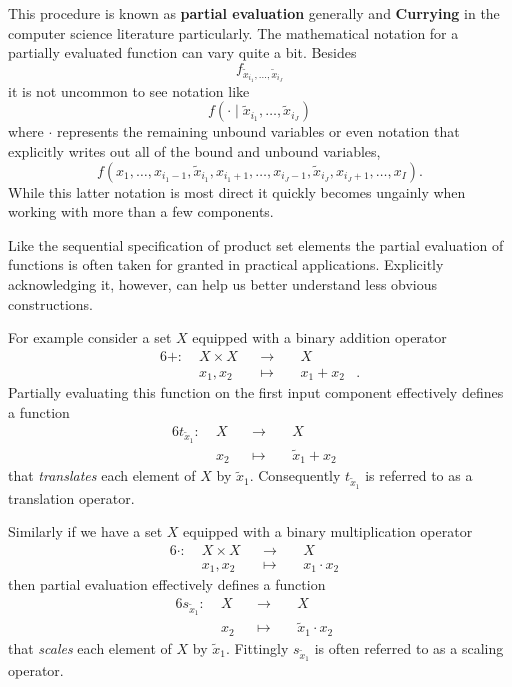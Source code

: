 \documentclass[
  letterpaper,
  DIV=11,
  numbers=noendperiod]{scrartcl}
\begin{document}
This procedure is known as \textbf{partial evaluation} generally and
\textbf{Currying} in the computer science literature particularly. The
mathematical notation for a partially evaluated function can vary quite
a bit. Besides \[
f_{\tilde{x}_{i_{1}}, \ldots, \tilde{x}_{i_{J}}}
\] it is not uncommon to see notation like \[
f(\cdot \mid \tilde{x}_{i_{1}}, \ldots, \tilde{x}_{i_{J}})
\] where \(\cdot\) represents the remaining unbound variables or even
notation that explicitly writes out all of the bound and unbound
variables, \[
f(x_{1}, \ldots, x_{i_{1} - 1}, \tilde{x}_{i_{1}}, x_{i_{1} + 1}, \ldots,
x_{i_{J} - 1}, \tilde{x}_{i_{J}}, x_{i_{J} + 1}, \ldots,
x_{I} ).
\] While this latter notation is most direct it quickly becomes ungainly
when working with more than a few components.

Like the sequential specification of product set elements the partial
evaluation of functions is often taken for granted in practical
applications. Explicitly acknowledging it, however, can help us better
understand less obvious constructions.

For example consider a set \(X\) equipped with a binary addition
operator \begin{alignat*}{6}
+ :\; & X \times X& &\rightarrow& \; & X &
\\
& x_{1}, x_{2} & &\mapsto& & x_{1} + x_{2} &.
\end{alignat*} Partially evaluating this function on the first input
component effectively defines a function \begin{alignat*}{6}
t_{\tilde{x}_{1}} :\; &X& &\rightarrow& \; & X &
\\
& x_{2} & &\mapsto& & \tilde{x}_{1} + x_{2} &
\end{alignat*} that \emph{translates} each element of \(X\) by
\(\tilde{x}_{1}\). Consequently \(t_{\tilde{x}_{1}}\) is referred to as
a translation operator.

Similarly if we have a set \(X\) equipped with a binary multiplication
operator \begin{alignat*}{6}
\cdot :\; & X \times X& &\rightarrow& \; & X &
\\
& x_{1}, x_{2} & &\mapsto& & x_{1} \cdot x_{2} &
\end{alignat*} then partial evaluation effectively defines a function
\begin{alignat*}{6}
s_{\tilde{x}_{1}} :\; &X& &\rightarrow& \; & X &
\\
& x_{2} & &\mapsto& & \tilde{x}_{1} \cdot x_{2} &
\end{alignat*} that \emph{scales} each element of \(X\) by
\(\tilde{x}_{1}\). Fittingly \(s_{\tilde{x}_{1}}\) is often referred to
as a scaling operator.
\end{document}
